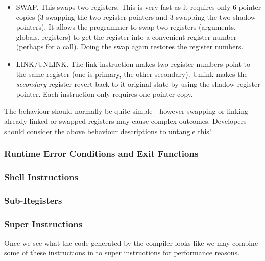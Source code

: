 \begin{itemize}
\item
  SWAP. This swaps two registers. This is very fast as it requires only
  6 pointer copies (3 swapping the two register pointers and 3 swapping
  the two shadow pointers). It allows the programmer to swap two
  registers (arguments, globals, registers) to get the register into a
  convenient register number (perhaps for a call). Doing the swap again
  restores the register numbers.
\item
  LINK/UNLINK. The link instruction makes two register numbers point to
  the same register (one is primary, the other secondary). Unlink makes
  the \emph{secondary} register revert back to it original state by
  using the shadow register pointer. Each instruction only requires one
  pointer copy.
\end{itemize}

The behaviour should normally be quite simple - however swapping or
linking already linked or swapped registers may cause complex outcomes.
Developers should consider the above behaviour descriptions to untangle
this!

\hypertarget{runtime-error-conditions-and-exit-functions}{%
\subsubsection{Runtime Error Conditions and Exit
Functions}\label{runtime-error-conditions-and-exit-functions}}

\hypertarget{shell-instructions}{%
\subsubsection{Shell Instructions}\label{shell-instructions}}

\hypertarget{sub-registers}{%
\subsubsection{Sub-Registers}\label{sub-registers}}

\hypertarget{super-instructions}{%
\subsubsection{Super Instructions}\label{super-instructions}}

Once we see what the code generated by the compiler looks like we may
combine some of these instructions in to super instructions for
performance reasons.

